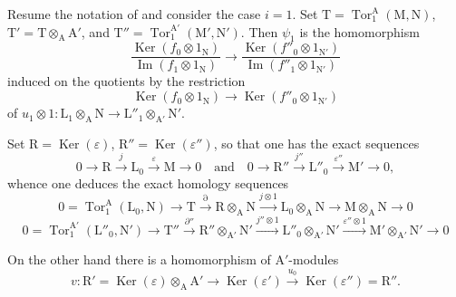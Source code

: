 \begin{env}[11.2.3]
\label{IV.11.2.3}
Resume the notation of  and consider the case $i=1$.
Set
$\mathrm{T}=\operatorname{Tor}_1^\mathrm{A}(\mathrm{M},\mathrm{N})$,
$\mathrm{T}'=\mathrm{T}\otimes_\mathrm{A}\mathrm{A}'$, and
$\mathrm{T}''=\operatorname{Tor}_1^{\mathrm{A}'}
(\mathrm{M}',\mathrm{N}')$. Then $\psi_1$ is the homomorphism
\[
  \frac{\operatorname{Ker}(f_0\otimes1_\mathrm{N})}
       {\operatorname{Im}(f_1\otimes1_\mathrm{N})}
  \longrightarrow
  \frac{\operatorname{Ker}(f''_0\otimes1_{\mathrm{N}'})}
       {\operatorname{Im}(f''_1\otimes1_{\mathrm{N}'})}
\]
induced on the quotients by the restriction
\[
  \operatorname{Ker}(f_0\otimes1_\mathrm{N})
  \longrightarrow
  \operatorname{Ker}(f''_0\otimes1_{\mathrm{N}'})
\]
of
$u_1\otimes1:\mathrm{L}_1\otimes_\mathrm{A}\mathrm{N}\to
\mathrm{L}''_1\otimes_{\mathrm{A}'}\mathrm{N}'$.

Set $\mathrm{R}=\operatorname{Ker}(\varepsilon)$, $\mathrm{R}''=\operatorname{Ker}(\varepsilon'')$, so that one has the exact sequences
\begin{equation}
  0\longrightarrow\mathrm{R}\xrightarrow{j}\mathrm{L}_0\xrightarrow{\varepsilon}\mathrm{M}\longrightarrow 0
  \quad\text{and}\quad
  0\longrightarrow\mathrm{R}''\xrightarrow{j''}\mathrm{L}''_0\xrightarrow{\varepsilon''}\mathrm{M}'\longrightarrow 0,
\end{equation}
whence one deduces the exact homology sequences
\begin{equation}
  0=\operatorname{Tor}_1^\mathrm{A}(\mathrm{L}_0,\mathrm{N})\to\mathrm{T}\xrightarrow{\partial}\mathrm{R}\otimes_\mathrm{A}\mathrm{N}\xrightarrow{j\otimes 1}\mathrm{L}_0\otimes_\mathrm{A}\mathrm{N}\to\mathrm{M}\otimes_\mathrm{A}\mathrm{N}\to 0
  \tag{11.2.3.1}
\end{equation}
\begin{equation}
  0=\operatorname{Tor}_1^{\mathrm{A}'}(\mathrm{L}''_0,\mathrm{N}')\to\mathrm{T}''\xrightarrow{\partial''}\mathrm{R}''\otimes_{\mathrm{A}'}\mathrm{N}'\xrightarrow{j''\otimes 1}\mathrm{L}''_0\otimes_{\mathrm{A}'}\mathrm{N}'\xrightarrow{\varepsilon''\otimes 1}\mathrm{M}'\otimes_{\mathrm{A}'}\mathrm{N}'\to 0
  \tag{11.2.3.2}
\end{equation}

On the other hand there is a homomorphism of $\mathrm{A}'$-modules
\[
  v:\mathrm{R}'=\operatorname{Ker}(\varepsilon)\otimes_\mathrm{A}\mathrm{A}'\longrightarrow\operatorname{Ker}(\varepsilon')\xrightarrow{u_0}\operatorname{Ker}(\varepsilon'')=\mathrm{R}''.
\]
\end{env}

